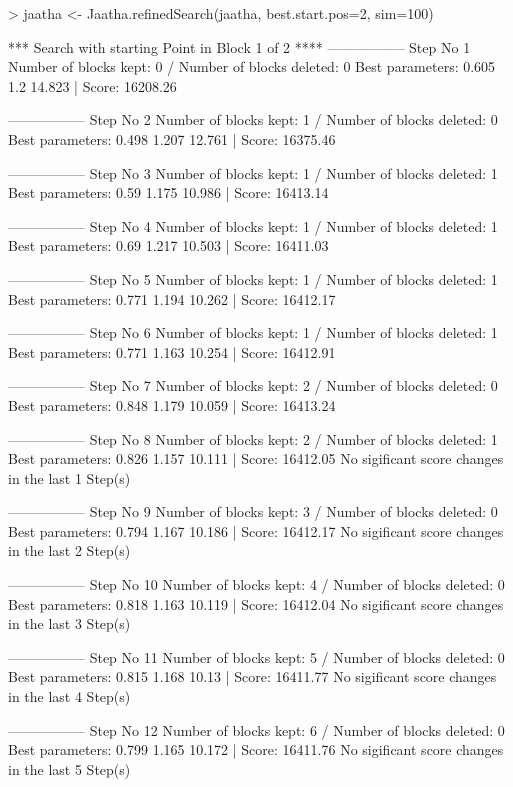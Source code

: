 
\begin{Schunk}
\begin{Sinput}
> jaatha <- Jaatha.refinedSearch(jaatha, best.start.pos=2, sim=100)
\end{Sinput}
\begin{Soutput}
*** Search with starting Point in Block 1 of 2 **** 
----------------- 
Step No 1 
Number of blocks kept: 0  / Number of blocks deleted: 0 
Best parameters:  0.605 1.2 14.823 | Score: 16208.26 

----------------- 
Step No 2 
Number of blocks kept: 1  / Number of blocks deleted: 0 
Best parameters:  0.498 1.207 12.761 | Score: 16375.46 

----------------- 
Step No 3 
Number of blocks kept: 1  / Number of blocks deleted: 1 
Best parameters:  0.59 1.175 10.986 | Score: 16413.14 

----------------- 
Step No 4 
Number of blocks kept: 1  / Number of blocks deleted: 1 
Best parameters:  0.69 1.217 10.503 | Score: 16411.03 

----------------- 
Step No 5 
Number of blocks kept: 1  / Number of blocks deleted: 1 
Best parameters:  0.771 1.194 10.262 | Score: 16412.17 

----------------- 
Step No 6 
Number of blocks kept: 1  / Number of blocks deleted: 1 
Best parameters:  0.771 1.163 10.254 | Score: 16412.91 

----------------- 
Step No 7 
Number of blocks kept: 2  / Number of blocks deleted: 0 
Best parameters:  0.848 1.179 10.059 | Score: 16413.24 

----------------- 
Step No 8 
Number of blocks kept: 2  / Number of blocks deleted: 1 
Best parameters:  0.826 1.157 10.111 | Score: 16412.05 
No sigificant score changes in the last 1 Step(s) 

----------------- 
Step No 9 
Number of blocks kept: 3  / Number of blocks deleted: 0 
Best parameters:  0.794 1.167 10.186 | Score: 16412.17 
No sigificant score changes in the last 2 Step(s) 

----------------- 
Step No 10 
Number of blocks kept: 4  / Number of blocks deleted: 0 
Best parameters:  0.818 1.163 10.119 | Score: 16412.04 
No sigificant score changes in the last 3 Step(s) 

----------------- 
Step No 11 
Number of blocks kept: 5  / Number of blocks deleted: 0 
Best parameters:  0.815 1.168 10.13 | Score: 16411.77 
No sigificant score changes in the last 4 Step(s) 

----------------- 
Step No 12 
Number of blocks kept: 6  / Number of blocks deleted: 0 
Best parameters:  0.799 1.165 10.172 | Score: 16411.76 
No sigificant score changes in the last 5 Step(s) 


\end{Soutput}
\end{Schunk}
